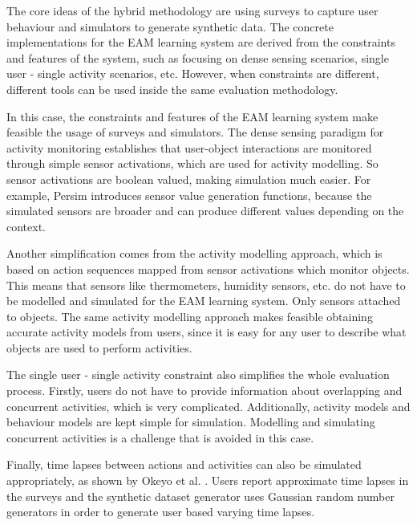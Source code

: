 The core ideas of the hybrid methodology are using surveys to capture user behaviour and simulators to generate synthetic data. The concrete implementations for the EAM learning system are derived from the constraints and features of the system, such as focusing on dense sensing scenarios, single user - single activity scenarios, etc. However, when constraints are different, different tools can be used inside the same evaluation methodology. 

In this case, the constraints and features of the EAM learning system make feasible the usage of surveys and simulators. The dense sensing paradigm for activity monitoring establishes that user-object interactions are monitored through simple sensor activations, which are used for activity modelling. So sensor activations are boolean valued, making simulation much easier. For example, Persim introduces sensor value generation functions, because the simulated sensors are broader and can produce different values depending on the context. 

Another simplification comes from the activity modelling approach, which is based on action sequences mapped from sensor activations which monitor objects. This means that sensors like thermometers, humidity sensors, etc. do not have to be modelled and simulated for the EAM learning system. Only sensors attached to objects. The same activity modelling approach makes feasible obtaining accurate activity models from users, since it is easy for any user to describe what objects are used to perform activities. 

The single user - single activity constraint also simplifies the whole evaluation process. Firstly, users do not have to provide information about overlapping and concurrent activities, which is very complicated. Additionally, activity models and behaviour models are kept simple for simulation. Modelling and simulating concurrent activities is a challenge that is avoided in this case. 

Finally, time lapses between actions and activities can also be simulated appropriately, as shown by Okeyo et al. \cite{Okeyo2012a}. Users report approximate time lapses in the surveys and the synthetic dataset generator uses Gaussian random number generators in order to generate user based varying time lapses. 

